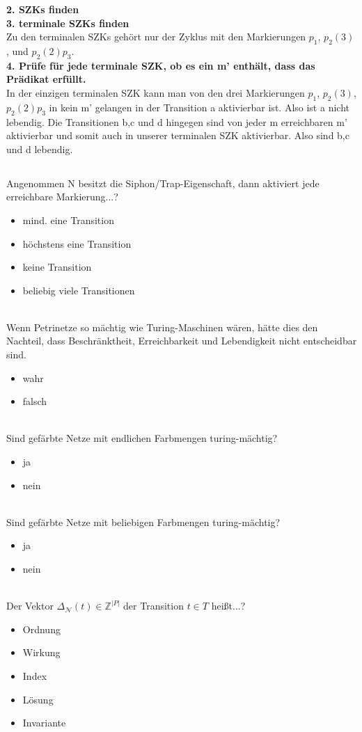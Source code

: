 \documentclass[a4paper,12pt]{scrartcl}
\begin{document}
\textbf{2. SZKs finden}\\
\textbf{3. terminale SZKs finden}\\
Zu den terminalen SZKs gehört nur der Zyklus mit den Markierungen $p_1$, $p_2 (3)$, und $p_2 (2)p_3$.\\
\textbf{4. Prüfe für jede terminale SZK, ob es ein m' enthält, dass das Prädikat erfüllt.} \\
In der einzigen terminalen SZK kann man von den drei Markierungen $p_1$, $p_2 (3)$,$p_2 (2)p_3$ in kein m' gelangen in der Transition a aktivierbar ist. Also ist a nicht lebendig. Die Transitionen b,c und d hingegen sind von jeder m erreichbaren m' aktivierbar und somit auch in unserer terminalen SZK aktivierbar. Also sind b,c und d lebendig.
\subsection{}
\subsection{}
Angenommen N besitzt die Siphon/Trap-Eigenschaft, dann aktiviert jede erreichbare Markierung...?
\begin{itemize}
\item{mind. eine Transition}
\item{höchstens eine Transition}
\item{keine Transition}
\item{beliebig viele Transitionen}
\end{itemize}\\
Wenn Petrinetze so mächtig wie Turing-Maschinen wären, hätte dies den Nachteil, dass Beschränktheit, Erreichbarkeit und Lebendigkeit nicht entscheidbar sind.
\begin{itemize}
\item{wahr}
\item{falsch}
\end{itemize}\\
Sind gefärbte Netze mit endlichen Farbmengen turing-mächtig?
\begin{itemize}
\item{ja}
\item{nein}
\end{itemize}\\
Sind gefärbte Netze mit beliebigen Farbmengen turing-mächtig?
\begin{itemize}
\item{ja}
\item{nein}
\end{itemize}\\
Der Vektor $\Delta_{\mathcal{N}}(t)\in \mathds{Z}^{|P|}$ der Transition $t\in T$ heißt...?
\begin{itemize}
\item{Ordnung}
\item{Wirkung}
\item{Index}
\item{Lösung}
\item{Invariante}
\end{itemize}\\
\end{document}

